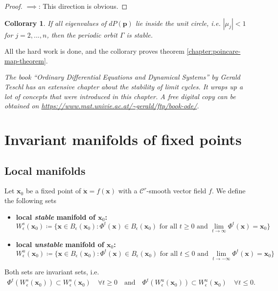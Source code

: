 \documentclass[hidelinks,a4paper, 11pt]{article}
\theoremstyle{plain}
\newtheorem{collorary}[theorem]{Collorary}
\theoremstyle{break}
\theoremstyle{plain}
\theoremstyle{definition}
\begin{document}
{\begin{proof}
	$\implies$: This direction is obvious.
\end{proof}

\begin{collorary}
	If all eigenvalues of $dP(\mathbf p)$ lie inside the unit circle, i.e. $|\mu_j| <1$ for $j=2,...,n$, then the periodic orbit $\Gamma$ is stable.
\end{collorary}

All the hard work is done, and the collorary proves theorem \ref{chapter:poincare-map-theorem}.

\textit{The book ``Ordinary Differential Equations and Dynamical Systems'' by Gerald Teschl has an extensive chapter about the stability of limit cycles. It wraps up a lot of concepts that were introduced in this chapter. A free digital copy can be obtained on \url{https://www.mat.univie.ac.at/~gerald/ftp/book-ode/}.}


\section{Invariant manifolds of fixed points}


\subsection{Local manifolds}

Let $\mathbf x_0$ be a fixed point of $\mathbf{\dot x} = f(\mathbf x)$ with a $\mathcal C^r$-smooth vector field $f$. We define the following sets
\begin{itemize}
	\item \textbf{local \emph{stable} manifold of $\mathbf x_0$:} $$W_{\epsilon}^s(\mathbf x_0) \coloneqq \{ \mathbf x \in B_{\epsilon}(\mathbf x_0) : \Phi^t(\mathbf x) \in B_{\epsilon}(\mathbf x_0) \text{ for all } t \geq 0 \text{ and } \lim_{t \to \infty}\Phi^t(\mathbf x) = \mathbf x_0 \}$$
	
	\item \textbf{local \emph{unstable} manifold of $\mathbf x_0$:} 
	\[
		W^{u}_{\epsilon}(\mathbf x_0) \coloneqq \{ \mathbf x \in B_{\epsilon}(\mathbf x_0) : \Phi^t(\mathbf x) \in B_{\epsilon}(\mathbf x_0) \text{ for all } t \leq 0 \text{ and } \lim_{t \to -\infty}\Phi^t(\mathbf x) = \mathbf x_0 \}
	\]
\end{itemize}

Both sets are invariant sets, i.e.
\begin{gather*}
\Phi^t(W^s_{\epsilon}(\mathbf x_0)) \subset W^s_{\epsilon}(\mathbf x_0) \quad \forall t \geq 0 \quad \text{and} \quad 
\Phi^t(W^u_{\epsilon}(\mathbf x_0)) \subset W^u_{\epsilon}(\mathbf x_0) \quad \forall t \leq 0.
\end{gather*}

}
\end{document}
